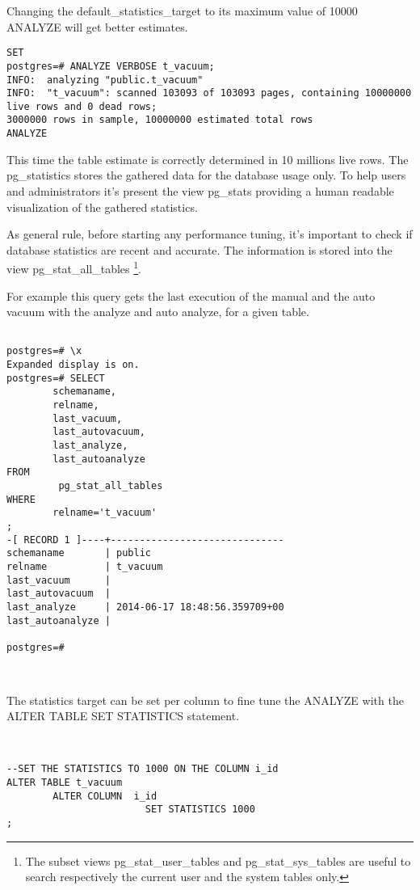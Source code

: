Changing the default\_statistics\_target to its maximum value of 10000 ANALYZE will get 
better estimates.


\begin{lstlisting}[style=pgsql]
SET
postgres=# ANALYZE VERBOSE t_vacuum;
INFO:  analyzing "public.t_vacuum"
INFO:  "t_vacuum": scanned 103093 of 103093 pages, containing 10000000 live rows and 0 dead rows; 
3000000 rows in sample, 10000000 estimated total rows
ANALYZE
\end{lstlisting}

This time the table estimate is correctly determined in 10 millions live rows.\newline
The pg\_statistics stores the gathered data for the database usage only. To help users and 
administrators it's present the view pg\_stats providing a human readable 
visualization of the gathered statistics.\newline

As general rule, before starting any performance tuning, it's important to check if 
database statistics are recent and accurate. The information is stored into the view 
pg\_stat\_all\_tables \footnote{The subset views pg\_stat\_user\_tables and pg\_stat\_sys\_tables 
are useful to search respectively the current user and the system tables only.}.

For example this query gets the last execution of the manual and the auto vacuum with the 
analyze and auto analyze, for a given table.

\begin{lstlisting}[style=pgsql]

postgres=# \x
Expanded display is on.
postgres=# SELECT
        schemaname,
        relname,
        last_vacuum,
        last_autovacuum,
        last_analyze,
        last_autoanalyze
FROM
         pg_stat_all_tables
WHERE
        relname='t_vacuum'
;
-[ RECORD 1 ]----+------------------------------
schemaname       | public
relname          | t_vacuum
last_vacuum      | 
last_autovacuum  | 
last_analyze     | 2014-06-17 18:48:56.359709+00
last_autoanalyze | 

postgres=# 



\end{lstlisting}


The statistics target can be set per column to fine tune the ANALYZE with the ALTER TABLE SET 
STATISTICS statement.

\begin{lstlisting}[style=pgsql]


--SET THE STATISTICS TO 1000 ON THE COLUMN i_id
ALTER TABLE t_vacuum 
        ALTER COLUMN  i_id 
                        SET STATISTICS 1000
;

\end{lstlisting}

